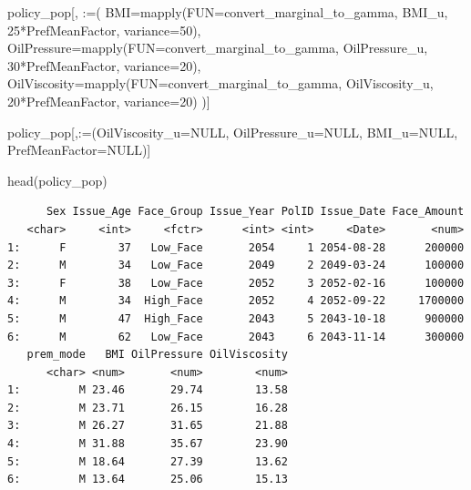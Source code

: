 \documentclass[
  letterpaper,
  DIV=11,
  numbers=noendperiod]{scrartcl}
\newenvironment{Shaded}{\begin{snugshade}}{\end{snugshade}}
\newcommand{\AttributeTok}[1]{\textcolor[rgb]{0.40,0.45,0.13}{#1}}
\newcommand{\ConstantTok}[1]{\textcolor[rgb]{0.56,0.35,0.01}{#1}}
\newcommand{\DecValTok}[1]{\textcolor[rgb]{0.68,0.00,0.00}{#1}}
\newcommand{\FunctionTok}[1]{\textcolor[rgb]{0.28,0.35,0.67}{#1}}
\newcommand{\NormalTok}[1]{\textcolor[rgb]{0.00,0.23,0.31}{#1}}
\newcommand{\SpecialCharTok}[1]{\textcolor[rgb]{0.37,0.37,0.37}{#1}}
\newcommand{\StringTok}[1]{\textcolor[rgb]{0.13,0.47,0.30}{#1}}
\begin{document}
\begin{Shaded}
\begin{Highlighting}[]
\NormalTok{policy\_pop[,}
           \StringTok{\textasciigrave{}}\AttributeTok{:=}\StringTok{\textasciigrave{}}\NormalTok{(}
             \AttributeTok{BMI=}\FunctionTok{mapply}\NormalTok{(}\AttributeTok{FUN=}\NormalTok{convert\_marginal\_to\_gamma,}
\NormalTok{                        BMI\_u,}
                        \DecValTok{25}\SpecialCharTok{*}\NormalTok{PrefMeanFactor,}
                        \AttributeTok{variance=}\DecValTok{50}\NormalTok{),}
             \AttributeTok{OilPressure=}\FunctionTok{mapply}\NormalTok{(}\AttributeTok{FUN=}\NormalTok{convert\_marginal\_to\_gamma,}
\NormalTok{                                OilPressure\_u,}
                                \DecValTok{30}\SpecialCharTok{*}\NormalTok{PrefMeanFactor,}
                                \AttributeTok{variance=}\DecValTok{20}\NormalTok{),}
             \AttributeTok{OilViscosity=}\FunctionTok{mapply}\NormalTok{(}\AttributeTok{FUN=}\NormalTok{convert\_marginal\_to\_gamma,}
\NormalTok{                                OilViscosity\_u,}
                                \DecValTok{20}\SpecialCharTok{*}\NormalTok{PrefMeanFactor,}
                                \AttributeTok{variance=}\DecValTok{20}\NormalTok{)}
\NormalTok{           )]}


\NormalTok{policy\_pop[,}\StringTok{\textasciigrave{}}\AttributeTok{:=}\StringTok{\textasciigrave{}}\NormalTok{(}\AttributeTok{OilViscosity\_u=}\ConstantTok{NULL}\NormalTok{,}
                 \AttributeTok{OilPressure\_u=}\ConstantTok{NULL}\NormalTok{,}
                 \AttributeTok{BMI\_u=}\ConstantTok{NULL}\NormalTok{,}
                 \AttributeTok{PrefMeanFactor=}\ConstantTok{NULL}\NormalTok{)]}

\FunctionTok{head}\NormalTok{(policy\_pop)}
\end{Highlighting}
\end{Shaded}

\begin{verbatim}
      Sex Issue_Age Face_Group Issue_Year PolID Issue_Date Face_Amount
   <char>     <int>     <fctr>      <int> <int>     <Date>       <num>
1:      F        37   Low_Face       2054     1 2054-08-28      200000
2:      M        34   Low_Face       2049     2 2049-03-24      100000
3:      F        38   Low_Face       2052     3 2052-02-16      100000
4:      M        34  High_Face       2052     4 2052-09-22     1700000
5:      M        47  High_Face       2043     5 2043-10-18      900000
6:      M        62   Low_Face       2043     6 2043-11-14      300000
   prem_mode   BMI OilPressure OilViscosity
      <char> <num>       <num>        <num>
1:         M 23.46       29.74        13.58
2:         M 23.71       26.15        16.28
3:         M 26.27       31.65        21.88
4:         M 31.88       35.67        23.90
5:         M 18.64       27.39        13.62
6:         M 13.64       25.06        15.13
\end{verbatim}
\end{document}
